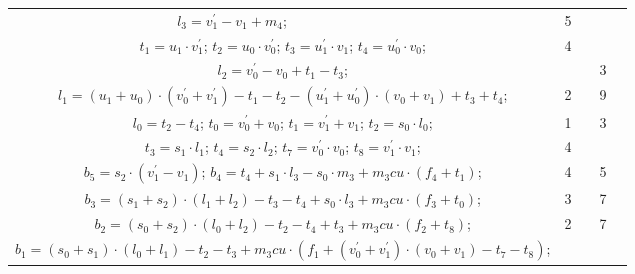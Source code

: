\begin{tabular}{|c|cr|c|c|c|c|}
{$l_3=v^{\prime}_1-v_1+m_4$;\hspace{4pt}
} &  &  & 5 & \\
\multicolumn{3}{|R{340pt}|}{ 
$t_1=u_1 \cdot v^{\prime}_1$;\hspace{4pt}
$t_2=u_0 \cdot v^{\prime}_0$;\hspace{4pt}
$t_3=u^{\prime}_1 \cdot v_1$;\hspace{4pt}
$t_4=u^{\prime}_0 \cdot v_0$;\hspace{4pt}
} & 4 &  &  & \\
\multicolumn{3}{|R{340pt}|}{ 
$l_2=v^{\prime}_0-v_0+t_1-t_3$;\hspace{4pt}
} &  &  & 3 & \\
\multicolumn{3}{|R{340pt}|}{ 
$l_1=(u_1+u_0) \cdot (v^{\prime}_0+v^{\prime}_1)-t_1-t_2-(u^{\prime}_1+u^{\prime}_0) \cdot (v_0+v_1)+t_3+t_4$;\hspace{4pt}
} & 2 &  & 9 & \\
\multicolumn{3}{|R{340pt}|}{ 
$l_0=t_2-t_4$;\hspace{4pt}
$t_0=v^{\prime}_0+v_0$;\hspace{4pt}
$t_1=v^{\prime}_1+v_1$;\hspace{4pt}
$t_2=s_0 \cdot l_0$;\hspace{4pt}
} & 1 &  & 3 & \\
\multicolumn{3}{|R{340pt}|}{ 
$t_3=s_1 \cdot l_1$;\hspace{4pt}
$t_4=s_2 \cdot l_2$;\hspace{4pt}
$t_7=v^{\prime}_0 \cdot v_0$;\hspace{4pt}
$t_8=v^{\prime}_1 \cdot v_1$;\hspace{4pt}
} & 4 &  &  & \\
\multicolumn{3}{|R{340pt}|}{ 
$b_5=s_2 \cdot (v^{\prime}_1-v_1)$;\hspace{4pt}
$b_4=t_4+s_1 \cdot l_3-s_0 \cdot m_3+m_3cu \cdot (f_4+t_1)$;\hspace{4pt}
} & 4 &  & 5 & \\
\multicolumn{3}{|R{340pt}|}{ 
$b_3=(s_1+s_2) \cdot (l_1+l_2)-t_3-t_4+s_0 \cdot l_3+m_3cu \cdot (f_3+t_0)$;\hspace{4pt}
} & 3 &  & 7 & \\
\multicolumn{3}{|R{340pt}|}{ 
$b_2=(s_0+s_2) \cdot (l_0+l_2)-t_2-t_4+t_3+m_3cu \cdot (f_2+t_8)$;\hspace{4pt}
} & 2 &  & 7 & \\
\multicolumn{3}{|R{340pt}|}{ 
$b_1=(s_0+s_1) \cdot (l_0+l_1)-t_2-t_3+m_3cu \cdot (f_1+(v^{\prime}_0+v^{\prime}_1) \cdot (v_0+v_1)-t_7-t_8)$;\hspace{4pt}
}
\end{tabular}
